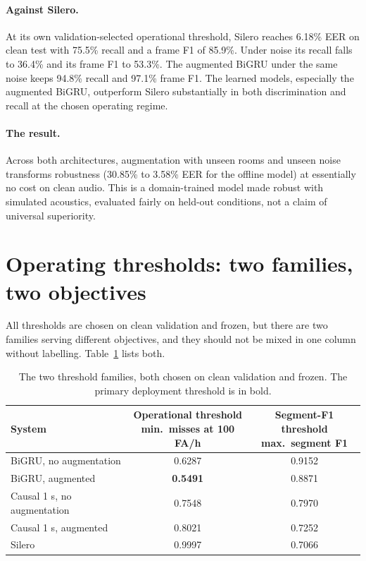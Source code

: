 \documentclass{article}
\begin{document}
\paragraph{Against Silero.} At its own validation-selected operational threshold, Silero reaches 6.18\% EER on clean test with 75.5\% recall and a frame F1 of 85.9\%. Under noise its recall falls to 36.4\% and its frame F1 to 53.3\%. The augmented BiGRU under the same noise keeps 94.8\% recall and 97.1\% frame F1. The learned models, especially the augmented BiGRU, outperform Silero substantially in both discrimination and recall at the chosen operating regime.

\paragraph{The result.} Across both architectures, augmentation with unseen rooms and unseen noise transforms robustness (30.85\% to 3.58\% EER for the offline model) at essentially no cost on clean audio. This is a domain-trained model made robust with simulated acoustics, evaluated fairly on held-out conditions, not a claim of universal superiority.

\section{Operating thresholds: two families, two objectives}
\label{sec:thresholds}

All thresholds are chosen on clean validation and frozen, but there are two families serving different objectives, and they should not be mixed in one column without labelling. Table~\ref{tab:thresholds} lists both.

\begin{table}[t]
    \centering
    \caption{The two threshold families, both chosen on clean validation and frozen. The primary deployment threshold is in bold.}
    \label{tab:thresholds}
    \small
    \begin{tabular}{lcc}
        \toprule
        System & \shortstack{Operational threshold\\ \scriptsize min.\ misses at 100 FA/h} & \shortstack{Segment-F1 threshold\\ \scriptsize max.\ segment F1} \\
        \midrule
        BiGRU, no augmentation      & 0.6287          & 0.9152 \\
        BiGRU, augmented            & \textbf{0.5491} & 0.8871 \\
        Causal 1 s, no augmentation & 0.7548          & 0.7970 \\
        Causal 1 s, augmented       & 0.8021          & 0.7252 \\
        Silero                      & 0.9997          & 0.7066 \\
        \bottomrule
    \end{tabular}
\end{table}
\end{document}
